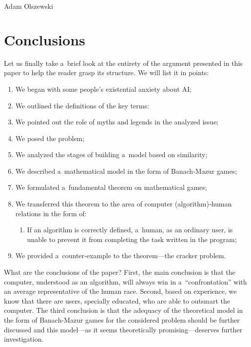\begin{artengenv}{Adam Olszewski}
\section{Conclusions}
Let us finally take a~brief look at the entirety of the argument presented in this paper to help the reader grasp its structure. We will list it in points:
\begin{enumerate}[label=\roman*.]
\item We began with some people's existential anxiety about AI;
\item We outlined the definitions of the key terms:
\item We pointed out the role of myths and legends in the analyzed issue;
\item We posed the problem;
\item We analyzed the stages of building a~model based on similarity;
\item We described a~mathematical model in the form of Banach-Mazur games;
\item We formulated a~fundamental theorem on mathematical games;
\item We transferred this theorem to the area of computer (algorithm)-human relations in the form of:
\begin{enumerate}[label=\alph*.]
\item If an algorithm is correctly defined, a~human, as an ordinary user, is unable to prevent it from completing the task written in the program;
\end{enumerate}
\item We provided a~counter-example to the theorem---the cracker problem.
\end{enumerate}
What are the conclusions of the paper? First, the main conclusion is that the computer, understood as an algorithm, will always win in a~``confrontation'' with an average representative of the human race. Second, based on experience, we know that there are users, specially educated, who are able to outsmart the computer. The third conclusion is that the adequacy of the theoretical model in the form of Banach-Mazur games for the considered problem should be further discussed and this model---as it seems theoretically promising---deserves further investigation.



\end{artengenv}

